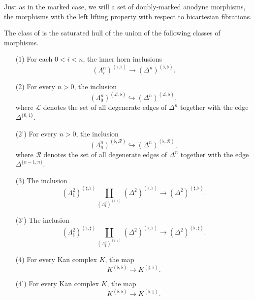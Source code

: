 \documentclass[main.tex]{subfiles}
\begin{document}
Just as in the marked case, we will a set of doubly-marked anodyne morphisms, the morphisms with the left lifting property with respect to bicartesian fibrations.

\begin{definition}
  The class of  is the saturated hull of the union of the following classes of morphisms.
  \begin{enumerate}
    \item[(1)] For each $0  < i < n$, the inner horn inclusions
      \begin{equation*}
        (\Lambda^{n}_{i})^{(\flat, \flat)} \to (\Delta^{n})^{(\flat, \flat)}.
      \end{equation*}

    \item[(2)] For every $n > 0$, the inclusion
      \begin{equation*}
        (\Lambda^{n}_{0})^{(\mathcal{L}, \flat)} \hookrightarrow (\Delta^{n})^{(\mathcal{L}, \flat)},
      \end{equation*}
      where $\mathcal{L}$ denotes the set of all degenerate edges of $\Delta^{n}$ together with the edge $\Delta^{\{0, 1\}}$.

    \item[(2')] For every $n > 0$, the inclusion
      \begin{equation*}
        (\Lambda^{n}_{n})^{(\flat, \mathcal{R})} \hookrightarrow (\Delta^{n})^{(\flat, \mathcal{R})},
      \end{equation*}
      where $\mathcal{R}$ denotes the set of all degenerate edges of $\Delta^{n}$ together with the edge $\Delta^{\{n-1, n\}}$.

    \item[(3)] The inclusion
      \begin{equation*}
        (\Lambda^{2}_{1})^{(\sharp, \flat)} \coprod_{(\Lambda^{2}_{1})^{(\flat, \flat)}} (\Delta^{2})^{(\flat, \flat)} \to (\Delta^{2})^{(\sharp, \flat)}.
      \end{equation*}

    \item[(3')] The inclusion
      \begin{equation*}
        (\Lambda^{2}_{1})^{(\flat, \sharp)} \coprod_{(\Lambda^{2}_{1})^{(\flat, \flat)}} (\Delta^{2})^{(\flat, \flat)} \to (\Delta^{2})^{(\flat, \sharp)}.
      \end{equation*}

    \item[(4)] For every Kan complex $K$, the map
      \begin{equation*}
        K^{(\flat, \flat)} \to K^{(\sharp, \flat)}.
      \end{equation*}

    \item[(4')] For every Kan complex $K$, the map
      \begin{equation*}
        K^{(\flat, \flat)} \to K^{(\flat, \sharp)}.
      \end{equation*}
  \end{enumerate}
\end{definition}
\end{document}
